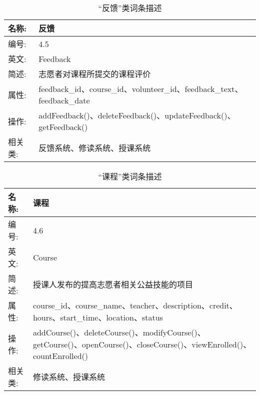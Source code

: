 \begin{table}[H]  
\caption{“反馈”类词条描述}  
\begin{center}  
    \begin{tabular}{l p{11cm}} 
        \hline
        \quad 名称:  &  反馈 \\
        \hline
        \quad 编号:  & 4.5 \\
        \hline
        \quad 英文:  &  Feedback \\
        \hline
        \quad 简述:  & 志愿者对课程所提交的课程评价 \\
        \hline
        \quad 属性:  & feedback\_id、course\_id、volunteer\_id、feedback\_text、feedback\_date \\
        \hline
        \quad 操作:  & addFeedback()、deleteFeedback()、updateFeedback()、getFeedback()\\
        \hline
        \quad 相关类:  & 反馈系统、修读系统、授课系统 \\
        \hline
    \end{tabular}
\end{center}
\end{table}


\begin{table}[H]  
\caption{“课程”类词条描述}  
\begin{center}  
    \begin{tabular}{l p{11cm}} 
        \hline
        \quad 名称:  &  课程 \\
        \hline
        \quad 编号:  & 4.6 \\
        \hline
        \quad 英文:  &  Course \\
        \hline
        \quad 简述:  & 授课人发布的提高志愿者相关公益技能的项目 \\
        \hline
        \quad 属性:  & course\_id、course\_name、teacher、description、credit、hours、start\_time、location、status \\
        \hline
        \quad 操作:  & addCourse()、deleteCourse()、modifyCourse()、getCourse()、openCourse()、closeCourse()、viewEnrolled()、countEnrolled()\\
        \hline
        \quad 相关类:  & 修读系统、授课系统 \\
        \hline
    \end{tabular}
\end{center}
\end{table}

